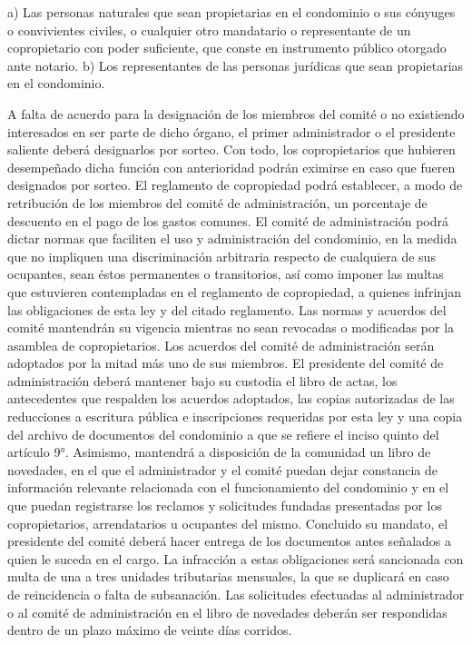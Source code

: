     a) Las personas naturales que sean propietarias en el condominio o sus cónyuges o convivientes civiles, o cualquier otro mandatario o representante de un copropietario con poder suficiente, que conste en instrumento público otorgado ante notario.
    b) Los representantes de las personas jurídicas que sean propietarias en el condominio.
     
    A falta de acuerdo para la designación de los miembros del comité o no existiendo interesados en ser parte de dicho órgano, el primer administrador o el presidente saliente deberá designarlos por sorteo. Con todo, los copropietarios que hubieren desempeñado dicha función con anterioridad podrán eximirse en caso que fueren designados por sorteo.
    El reglamento de copropiedad podrá establecer, a modo de retribución de los miembros del comité de administración, un porcentaje de descuento en el pago de los gastos comunes.
    El comité de administración podrá dictar normas que faciliten el uso y administración del condominio, en la medida que no impliquen una discriminación arbitraria respecto de cualquiera de sus ocupantes, sean éstos permanentes o transitorios, así como imponer las multas que estuvieren contempladas en el reglamento de copropiedad, a quienes infrinjan las obligaciones de esta ley y del citado reglamento. Las normas y acuerdos del comité mantendrán su vigencia mientras no sean revocadas o modificadas por la asamblea de copropietarios. Los acuerdos del comité de administración serán adoptados por la mitad más uno de sus miembros.
    El presidente del comité de administración deberá mantener bajo su custodia el libro de actas, los antecedentes que respalden los acuerdos adoptados, las copias autorizadas de las reducciones a escritura pública e inscripciones requeridas por esta ley y una copia del archivo de documentos del condominio a que se refiere el inciso quinto del artículo 9°. Asimismo, mantendrá a disposición de la comunidad un libro de novedades, en el que el administrador y el comité puedan dejar constancia de información relevante relacionada con el funcionamiento del condominio y en el que puedan registrarse los reclamos y solicitudes fundadas presentadas por los copropietarios, arrendatarios u ocupantes del mismo. Concluido su mandato, el presidente del comité deberá hacer entrega de los documentos antes señalados a quien le suceda en el cargo. La infracción a estas obligaciones será sancionada con multa de una a tres unidades tributarias mensuales, la que se duplicará en caso de reincidencia o falta de subsanación.
    Las solicitudes efectuadas al administrador o al comité de administración en el libro de novedades deberán ser respondidas dentro de un plazo máximo de veinte días corridos.

